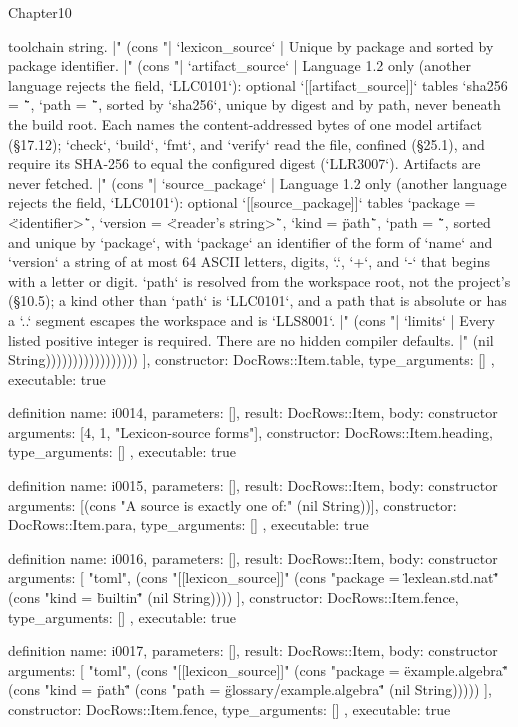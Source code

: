 \begin{lexlean}{Chapter10}
\begin{semanticmodule}
{{toolchain string. |" (cons "| `lexicon_source` | Unique by package and sorted by package identifier. |" (cons "| `artifact_source` | Language 1.2 only (another language rejects the field, `LLC0101`): optional `[[artifact_source]]` tables `sha256 = \"<64 lowercase hex>\"`, `path = \"<project-relative file>\"`, sorted by `sha256`, unique by digest and by path, never beneath the build root. Each names the content-addressed bytes of one model artifact (§17.12); `check`, `build`, `fmt`, and `verify` read the file, confined (§25.1), and require its SHA-256 to equal the configured digest (`LLR3007`). Artifacts are never fetched. |" (cons "| `source_package` | Language 1.2 only (another language rejects the field, `LLC0101`): optional `[[source_package]]` tables `package = \"<identifier>\"`, `version = \"<reader's string>\"`, `kind = \"path\"`, `path = \"<workspace-relative member directory>\"`, sorted and unique by `package`, with `package` an identifier of the form of `name` and `version` a string of at most 64 ASCII letters, digits, `.`, `+`, and `-` that begins with a letter or digit. `path` is resolved from the workspace root, not the project's (§10.5); a kind other than `path` is `LLC0101`, and a path that is absolute or has a `..` segment escapes the workspace and is `LLS8001`. |" (cons "| `limits` | Every listed positive integer is required. There are no hidden compiler defaults. |" (nil String)))))))))))))))))
    ],
    constructor: DocRows::Item.table,
    type_arguments: []
  },
  executable: true
}

definition{
  name: i0014,
  parameters: [],
  result: DocRows::Item,
  body: constructor{
    arguments: [4, 1, "Lexicon-source forms"],
    constructor: DocRows::Item.heading,
    type_arguments: []
  },
  executable: true
}

definition{
  name: i0015,
  parameters: [],
  result: DocRows::Item,
  body: constructor{
    arguments: [(cons "A source is exactly one of:" (nil String))],
    constructor: DocRows::Item.para,
    type_arguments: []
  },
  executable: true
}

definition{
  name: i0016,
  parameters: [],
  result: DocRows::Item,
  body: constructor{
    arguments: [
      "toml",
      (cons "[[lexicon_source]]" (cons "package = \"lexlean.std.nat\"" (cons "kind = \"builtin\"" (nil String))))
    ],
    constructor: DocRows::Item.fence,
    type_arguments: []
  },
  executable: true
}

definition{
  name: i0017,
  parameters: [],
  result: DocRows::Item,
  body: constructor{
    arguments: [
      "toml",
      (cons "[[lexicon_source]]" (cons "package = \"example.algebra\"" (cons "kind = \"path\"" (cons "path = \"glossary/example.algebra\"" (nil String)))))
    ],
    constructor: DocRows::Item.fence,
    type_arguments: []
  },
  executable: true
}


\end{semanticmodule}
\end{lexlean}
